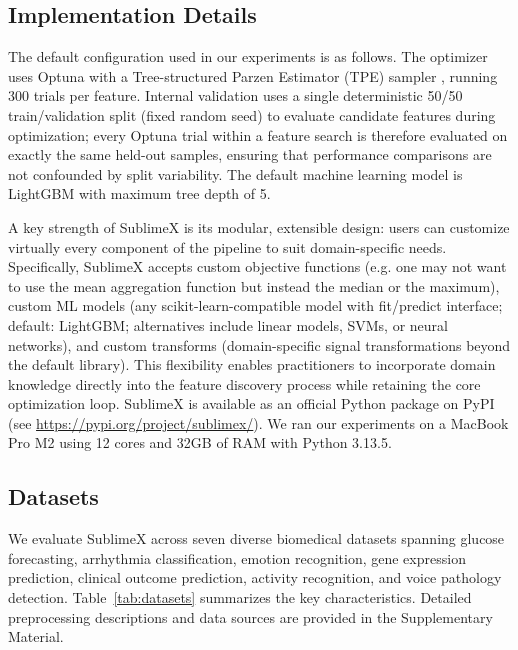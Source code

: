 \documentclass[times, review, 10pt]{elsarticle}
\begin{document}
\subsection{Implementation Details}
The default configuration used in our experiments is as follows. The optimizer uses Optuna with a Tree-structured Parzen Estimator (TPE) sampler \cite{bergstra2011tpe}, running 300 trials per feature. 
Internal validation uses a single deterministic 50/50
train/validation split (fixed random seed) to evaluate candidate
features during optimization; every Optuna trial within a feature
search is therefore evaluated on exactly the same held-out samples,
ensuring that performance comparisons are not confounded by split
variability. 
The default machine learning model is LightGBM with maximum tree depth of 5.

A key strength of SublimeX is its modular, extensible design: users can customize virtually every component of the pipeline to suit domain-specific needs. 
Specifically, SublimeX accepts custom objective functions (e.g. one may not want to use the mean aggregation function but instead the median or the maximum), custom ML models (any
scikit-learn-compatible model with fit/predict interface; default: LightGBM; alternatives include linear models, SVMs, or neural networks), and custom transforms 
(domain-specific signal transformations beyond the default library). 
This flexibility enables practitioners to incorporate domain knowledge directly into the feature discovery process while retaining the core optimization loop. 
SublimeX is available as an official Python package on PyPI (see \url{https://pypi.org/project/sublimex/}). We ran our experiments on a MacBook Pro M2 using 12 cores and 32GB of RAM with Python 3.13.5.

\subsection{Datasets}
We evaluate SublimeX across seven diverse biomedical datasets spanning glucose forecasting, arrhythmia classification, emotion recognition, gene expression prediction, clinical outcome prediction, 
activity recognition, and voice pathology detection. Table~\ref{tab:datasets} summarizes the key characteristics. Detailed preprocessing descriptions and data sources are provided in the Supplementary Material.


\end{document}
